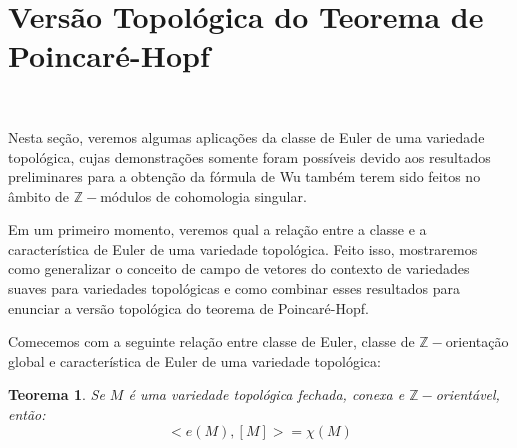 \documentclass[12pt,oneside]{book} %
\newtheorem{teo}    {\hspace{0.5cm}Teorema}[chapter]
\newcommand{\Z}{\mathbb{Z}}
\begin{document}
\section{Versão Topológica do Teorema de Poincaré-Hopf}\label{sec_poincare}

\

\par Nesta seção, veremos algumas aplicações da classe de Euler de uma variedade topológica, cujas demonstrações somente foram possíveis devido aos resultados preliminares para a obtenção da fórmula de Wu também terem sido feitos no âmbito de $\Z-$módulos de cohomologia singular.

\par Em um primeiro momento, veremos qual a relação entre a classe e a característica de Euler de uma variedade topológica. Feito isso, mostraremos como generalizar o conceito de campo de vetores do contexto de variedades suaves para variedades topológicas e como combinar esses resultados para enunciar a versão topológica do teorema de Poincaré-Hopf.

\par Comecemos com a seguinte relação entre classe de Euler, classe de $\Z-$orientação global e característica de Euler de uma variedade topológica:

\begin{teo}\label{ap_euler_1}
	Se $M$ é uma variedade topológica fechada, conexa e $\Z-$orientável, então:
	$$ <e(M),[M]>=\chi(M) $$
\end{teo}
\end{document}
